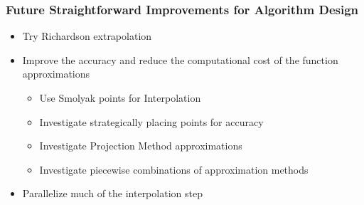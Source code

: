 \documentclass{beamer}
\begin{document}
  \begin{frame}
    \frametitle{Future Straightforward Improvements for Algorithm Design}
    \begin{itemize}
     \item Try Richardson extrapolation
\item Improve the accuracy and reduce the computational cost of the function approximations
      \begin{itemize}
\item  Use Smolyak points for Interpolation
\item Investigate strategically placing points for accuracy
\item  Investigate Projection Method approximations
\item Investigate piecewise combinations of approximation methods
      \end{itemize}
\item Parallelize much of the interpolation step


\end{itemize}
\end{frame}
\end{document}
